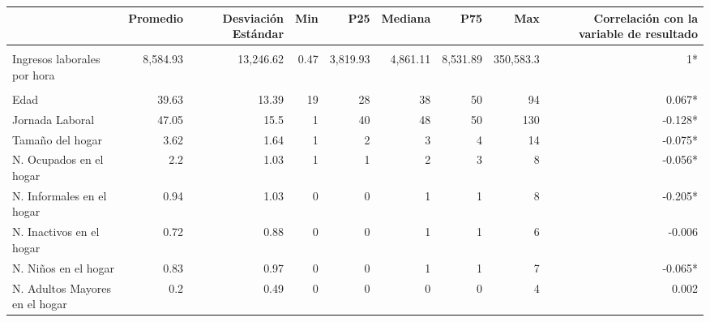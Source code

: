 \begin{table}[t]
\fontsize{12.0pt}{14.4pt}\selectfont
\begin{tabular*}{\linewidth}{@{\extracolsep{\fill}}lrrrrrrrr}
\toprule
  & Promedio & Desviación Estándar & Min & P25 & Mediana & P75 & Max & Correlación con la variable de resultado \\ 
\midrule\addlinespace[2.5pt]
\multicolumn{9}{l}{{\bfseries Resultado}} \\[2.5pt] 
\midrule\addlinespace[2.5pt]
Ingresos laborales por hora & 8,584.93 & 13,246.62 & 0.47 & 3,819.93 & 4,861.11 & 8,531.89 & 350,583.3 & 1* \\ 
\midrule\addlinespace[2.5pt]
\multicolumn{9}{l}{{\bfseries Predictores continuos}} \\[2.5pt] 
\midrule\addlinespace[2.5pt]
Edad & 39.63 & 13.39 & 19 & 28 & 38 & 50 & 94 & 0.067* \\ 
Jornada Laboral & 47.05 & 15.5 & 1 & 40 & 48 & 50 & 130 & -0.128* \\ 
Tamaño del hogar & 3.62 & 1.64 & 1 & 2 & 3 & 4 & 14 & -0.075* \\ 
N. Ocupados en el hogar & 2.2 & 1.03 & 1 & 1 & 2 & 3 & 8 & -0.056* \\ 
N. Informales en el hogar & 0.94 & 1.03 & 0 & 0 & 1 & 1 & 8 & -0.205* \\ 
N. Inactivos en el hogar & 0.72 & 0.88 & 0 & 0 & 1 & 1 & 6 & -0.006 \\ 
N. Niños en el hogar & 0.83 & 0.97 & 0 & 0 & 1 & 1 & 7 & -0.065* \\ 
N. Adultos Mayores en el hogar & 0.2 & 0.49 & 0 & 0 & 0 & 0 & 4 & 0.002 \\ 
\bottomrule
\end{tabular*}
\end{table}

